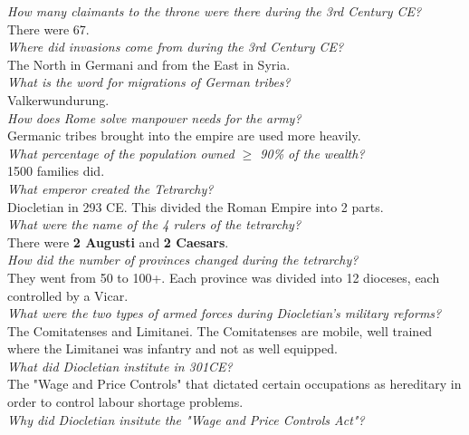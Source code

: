 \documentclass[12pt]{article}
\begin{document}
\textit{How many claimants to the throne were there during the 3rd Century CE?}\\
There were 67.\\

\textit{Where did invasions come from during the 3rd Century CE?}\\
The North in Germani and from the East in Syria.\\

\textit{What is the word for migrations of German tribes?}\\
Valkerwundurung.\\

\textit{How does Rome solve manpower needs for the army?}\\
Germanic tribes brought into the empire are used more heavily.\\

\textit{What percentage of the population owned $\geq$ 90\% of the wealth?}\\
1500 families did.\\

\textit{What emperor created the Tetrarchy?}\\
Diocletian in 293 CE. This divided the Roman Empire into 2 parts.\\

\textit{What were the name of the 4 rulers of the tetrarchy?}\\
There were \textbf{2 Augusti} and \textbf{2 Caesars}.\\

\textit{How did the number of provinces changed during the tetrarchy?}\\
They went from 50 to 100+. Each province was divided into 12 dioceses, each controlled by a Vicar.\\

\textit{What were the two types of armed forces during Diocletian's military reforms?}\\
The Comitatenses and Limitanei. The Comitatenses are mobile, well trained where the Limitanei was infantry and not as well equipped.\\

\textit{What did Diocletian institute in 301CE?}\\
The "Wage and Price Controls" that dictated certain occupations as hereditary in order to control labour shortage problems.\\

\textit{Why did Diocletian insitute the "Wage and Price Controls Act"?}
\end{document}
